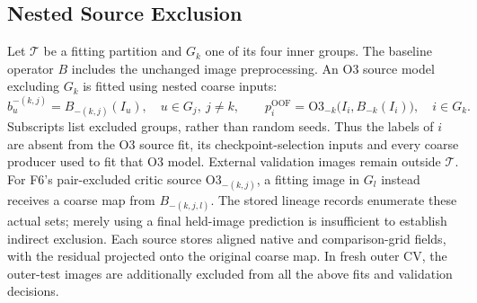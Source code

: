 \documentclass[jimaging,article,submit,pdftex,moreauthors]{Definitions/mdpi}
\begin{document}
\subsection{Nested Source Exclusion}
Let $\mathcal{T}$ be a fitting partition and $G_k$ one of its four inner
groups. The baseline operator $B$ includes the unchanged image preprocessing.
An O3 source model excluding $G_k$ is fitted using nested coarse inputs:
\begin{equation}
b_u^{-(k,j)}=B_{-(k,j)}(I_u),\quad u\in G_j,\ j\ne k,
\qquad
p_i^{\mathrm{OOF}}=\mathrm{O3}_{-k}\bigl(I_i,B_{-k}(I_i)\bigr),\quad i\in G_k.
\label{eq:nested-source}
\end{equation}
Subscripts list excluded groups, rather than random seeds. Thus the labels of
$i$ are absent from the O3 source fit, its checkpoint-selection inputs and
every coarse producer used to fit that O3 model. External validation images
remain outside $\mathcal{T}$. For F6's pair-excluded critic source
$\mathrm{O3}_{-(k,j)}$, a fitting image in $G_l$ instead receives a coarse map
from $B_{-(k,j,l)}$. The stored lineage records enumerate these actual sets;
merely using a final held-image prediction is insufficient to establish
indirect exclusion. Each source stores aligned native and comparison-grid
fields, with the residual projected onto the original coarse map. In fresh
outer CV, the outer-test images are additionally excluded from all the above
fits and validation decisions.

\end{document}
